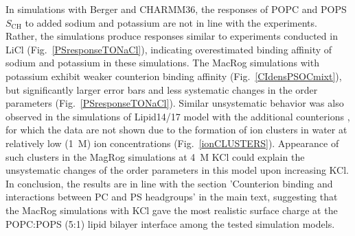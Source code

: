 \documentclass[journal=jpcbfk,manuscript=article]{achemso}
\begin{document}
In simulations with Berger and CHARMM36, the responses of POPC and POPS $S_\mathrm{CH}$
to added sodium and potassium are not in line with the experiments. Rather, the simulations produce responses similar to experiments conducted in LiCl (Fig.~\ref{PSresponseTONaCl}), indicating overestimated binding affinity of sodium and potassium 
in these simulations. The MacRog simulations with potassium exhibit weaker counterion binding affinity
(Fig.~\ref{CIdensPSOCmixt}), but significantly larger error bars and
less systematic changes in the order parameters (Fig.~\ref{PSresponseTONaCl}).
Similar unsystematic behavior was also observed in the simulations of Lipid14/17 model
with the additional counterions \cite{POPCpopsLIPID17withKCI,POPCpopsLIPID17withK,POPCpopsLIPID17withNaCI,POPCpopsLIPID17withNa},
for which the data are not shown due to the formation of
ion clusters in water at relatively low (1~M) ion concentrations (Fig.~\ref{ionCLUSTERS}).
Appearance of such clusters in the MagRog simulations at 4~M KCl
could explain the unsystematic changes of the order parameters in this model upon increasing KCl.
In conclusion, the results are in line with the section 'Counterion binding and interactions between PC and PS headgroups' %
in the main text, suggesting that the MacRog simulations with KCl gave the most
realistic surface charge at the POPC:POPS (5:1) lipid bilayer interface among the tested simulation models.
\end{document}
